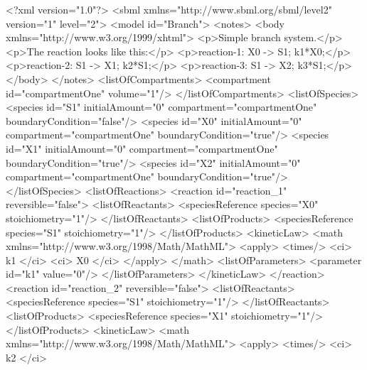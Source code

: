 \documentclass[10pt,twocolumntoc]{cekarticle}
\begin{document}
\begin{example}
<?xml version="1.0"?>
<sbml xmlns="http://www.sbml.org/sbml/level2" version="1" level="2">
    <model id="Branch">
        <notes>
            <body xmlns="http://www.w3.org/1999/xhtml">
                <p>Simple branch system.</p>
                <p>The reaction looks like this:</p>
                <p>reaction-1:   X0 -> S1; k1*X0;</p>
                <p>reaction-2:   S1 -> X1; k2*S1;</p>
                <p>reaction-3:   S1 -> X2; k3*S1;</p>
            </body>
        </notes>
        <listOfCompartments>
            <compartment id="compartmentOne" volume="1"/>
        </listOfCompartments>
        <listOfSpecies>
            <species id="S1" initialAmount="0" compartment="compartmentOne"
                     boundaryCondition="false"/>
            <species id="X0" initialAmount="0" compartment="compartmentOne"
                     boundaryCondition="true"/>
            <species id="X1" initialAmount="0" compartment="compartmentOne"
                     boundaryCondition="true"/>
            <species id="X2" initialAmount="0" compartment="compartmentOne"
                     boundaryCondition="true"/>
        </listOfSpecies>
        <listOfReactions>
            <reaction id="reaction_1" reversible="false">
                <listOfReactants>
                    <speciesReference species="X0" stoichiometry="1"/>
                </listOfReactants>
                <listOfProducts>
                    <speciesReference species="S1" stoichiometry="1"/>
                </listOfProducts>
                <kineticLaw>
                    <math xmlns="http://www.w3.org/1998/Math/MathML">
                        <apply>
                            <times/>
                            <ci> k1 </ci>
                            <ci> X0 </ci>
                        </apply>
                    </math>
                    <listOfParameters>
                        <parameter id="k1" value="0"/>
                    </listOfParameters>
                </kineticLaw>
            </reaction>
            <reaction id="reaction_2" reversible="false">
                <listOfReactants>
                    <speciesReference species="S1" stoichiometry="1"/>
                </listOfReactants>
                <listOfProducts>
                    <speciesReference species="X1" stoichiometry="1"/>
                </listOfProducts>
                <kineticLaw>
                    <math xmlns="http://www.w3.org/1998/Math/MathML">
                        <apply>
                            <times/>
                            <ci> k2 </ci>

\end{example}
\end{document}
